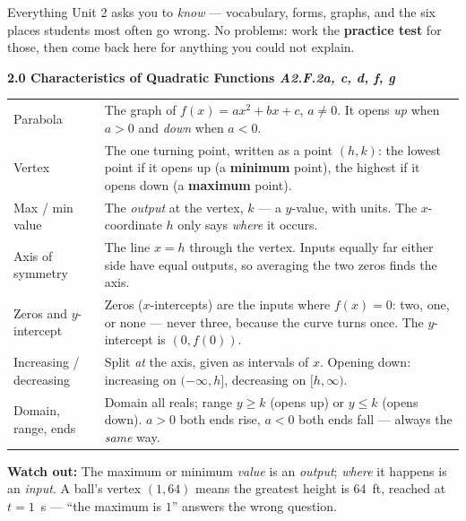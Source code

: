 \documentclass[10pt]{article}
\newcommand{\sghead}[2]{%
  \boxguard[10]%
  \vspace{4pt}\par\noindent
  \colorbox{forest}{\parbox{\dimexpr\linewidth-2\fboxsep}{%
    \small\color{white}\bfseries #1 \hfill \textmd{\itshape\scriptsize\color{forestmid} #2}}}%
  \vspace{2pt}\par}
\newcommand{\sgwatch}[1]{%
  \vspace{1pt}\par\noindent
  \colorbox{redbg}{\parbox{\dimexpr\linewidth-2\fboxsep}{%
    \footnotesize\textbf{\textcolor{redacc}{Watch out:}} #1}}%
  \vspace{1pt}\par}
\newcommand{\sgtabsetup}{\renewcommand{\arraystretch}{1.06}\footnotesize}
\begin{document}

\vspace{-0.30in}
\noindent\footnotesize Everything Unit 2 asks you to \emph{know} --- vocabulary, forms, graphs,
and the six places students most often go wrong. No problems: work the \textbf{practice test}
for those, then come back here for anything you could not explain.\par\normalsize

\sghead{2.0 \quad Characteristics of Quadratic Functions}{A2.F.2a, c, d, f, g}
{\sgtabsetup
\begin{tabularx}{\linewidth}{@{} G X @{}}
Parabola & The graph of $f(x)=ax^2+bx+c$, $a\ne0$. It opens \emph{up} when $a>0$ and
  \emph{down} when $a<0$. \\
Vertex & The one turning point, written as a point $(h,k)$: the lowest point if it opens up (a
  \textbf{minimum} point), the highest if it opens down (a \textbf{maximum} point). \\
Max / min value & The \emph{output} at the vertex, $k$ --- a $y$-value, with units. The
  $x$-coordinate $h$ only says \emph{where} it occurs. \\
Axis of symmetry & The line $x=h$ through the vertex. Inputs equally far either side have equal
  outputs, so averaging the two zeros finds the axis. \\
Zeros and $y$-intercept & Zeros ($x$-intercepts) are the inputs where $f(x)=0$: two, one, or
  none --- never three, because the curve turns once. The $y$-intercept is $(0,f(0))$. \\
Increasing / decreasing & Split \emph{at} the axis, given as intervals of $x$. Opening down:
  increasing on $(-\infty,h]$, decreasing on $[h,\infty)$. \\
Domain, range, ends & Domain all reals; range $y\ge k$ (opens up) or $y\le k$ (opens down).
  $a>0$ both ends rise, $a<0$ both ends fall --- always the \emph{same} way. \\
\end{tabularx}}
\sgwatch{The maximum or minimum \emph{value} is an \emph{output}; \emph{where} it happens is an
\emph{input}. A ball's vertex $(1,64)$ means the greatest height is $64$~ft, reached at $t=1$~s
--- ``the maximum is $1$'' answers the wrong question.}
\end{document}
